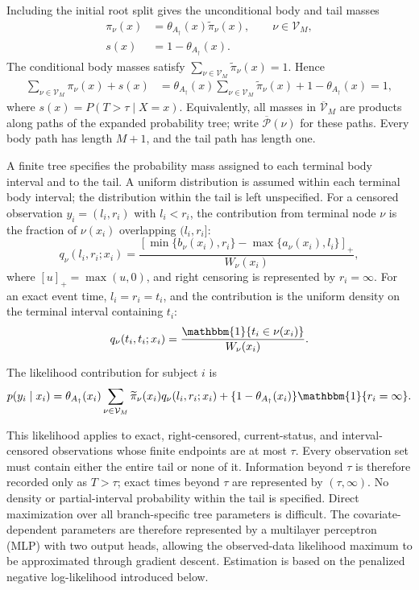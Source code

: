 \documentclass[11pt]{article}
\numberwithin{equation}{section}
\begin{document}
Including the initial root split gives the unconditional body and tail masses
\begin{equation}
\begin{aligned}
    \pi_\nu(x)&=\theta_{A_\dagger}(x)\widetilde\pi_\nu(x),
      \qquad \nu\in\mathcal V_M,\\
    s(x)&=1-\theta_{A_\dagger}(x).
\end{aligned}
\label{eq:body-tail-masses}
\end{equation}
The conditional body masses satisfy $\sum_{\nu\in\mathcal V_M}\widetilde\pi_\nu(x)=1$. Hence
\begin{align*}
    \sum_{\nu\in\mathcal V_M}\pi_\nu(x)+s(x)
    &=\theta_{A_\dagger}(x)\sum_{\nu\in\mathcal V_M}\widetilde\pi_\nu(x)
      +1-\theta_{A_\dagger}(x)=1,
\end{align*}
where $s(x)=P(T>\tau\mid X=x)$. Equivalently, all masses in $\overline{\mathcal V}_M$ are products along paths of the expanded probability tree; write $\overline{\mathcal P}(\nu)$ for these paths. Every body path has length $M+1$, and the tail path has length one.

A finite tree specifies the probability mass assigned to each terminal body interval and to the tail. A uniform distribution is assumed within each terminal body interval; the distribution within the tail is left unspecified. For a censored observation $y_i=(l_i,r_i)$ with $l_i<r_i$, the contribution from terminal node $\nu$ is the fraction of $\nu(x_i)$ overlapping $(l_i,r_i]$:
$$
    q_\nu(l_i,r_i;x_i)
    =
    \frac{
        \left[\min\{b_\nu(x_i),r_i\}-\max\{a_\nu(x_i),l_i\}\right]_+
    }{
        W_\nu(x_i)
    },
$$
where $[u]_+=\max(u,0)$, and right censoring is represented by $r_i=\infty$. For an exact event time, $l_i=r_i=t_i$, and the contribution is the uniform density on the terminal interval containing $t_i$:
$$
    q_\nu(t_i,t_i;x_i)
    =
    \frac{\mathbbm{1}\{t_i\in\nu(x_i)\}}{W_\nu(x_i)}.
$$

The likelihood contribution for subject $i$ is
$$
    p(y_i\mid x_i)
    =
    \theta_{A_\dagger}(x_i)\sum_{\nu\in\mathcal V_M}
    \widetilde\pi_\nu(x_i)
    q_\nu(l_i,r_i;x_i)+\{1-\theta_{A_\dagger}(x_i)\}\mathbbm{1}\{r_i=\infty\}.
$$

This likelihood applies to exact, right-censored, current-status, and interval-censored observations whose finite endpoints are at most $\tau$. Every observation set must contain either the entire tail or none of it. Information beyond $\tau$ is therefore recorded only as $T>\tau$; exact times beyond $\tau$ are represented by $(\tau,\infty)$. No density or partial-interval probability within the tail is specified. Direct maximization over all branch-specific tree parameters is difficult. The covariate-dependent parameters are therefore represented by a multilayer perceptron (MLP) with two output heads, allowing the observed-data likelihood maximum to be approximated through gradient descent. Estimation is based on the penalized negative log-likelihood introduced below.
\end{document}
